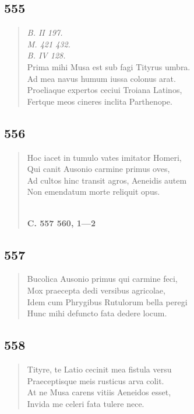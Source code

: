 \documentclass[11pt, a4paper]{report}
\begin{document}
            \subsection*{555}
      \begin{verse}
      \textit{B. II 197.} \\ \textit{M. 421 432.} \\ \textit{B. IV 128.} \\ Prima mihi Musa est sub fagi Tityrus umbra. \\ Ad mea navus humum iussa colonus arat. \\ Proeliaque expertos ceciui Troiana Latinos, \\ Fertque meos cineres inclita Parthenope. \\ 
      \end{verse}
  
            \subsection*{556}
      \begin{verse}
      Hoc iacet in tumulo vates imitator Homeri, \\ Qui canit Ausonio carmine primus oves, \\ Ad cultos hinc transit agros, Aeneidis autem \\ Non emendatum morte reliquit opus. \\ 
        ﻿\pagebreak 
    \begin{center} \textbf{C. 557 560, 1—2} \end{center} \marginpar{[73]} 
      \end{verse}
  
            \subsection*{557}
      \begin{verse}
      Bucolica Ausonio primus qui carmine feci, \\ Mox praecepta dedi versibus agricolae, \\ Idem cum Phrygibus Rutulorum bella peregi \\ Hunc mihi defuncto fata dedere locum. \\ 
      \end{verse}
  
            \subsection*{558}
      \begin{verse}
      Tityre, te Latio cecinit mea fistula versu \\ Praeceptisque meis rusticus arva colit. \\ At ne Musa carens vitiis Aeneidos esset, \\ Invida me celeri fata tulere nece. \\ 
      \end{verse}
  
\end{document}
